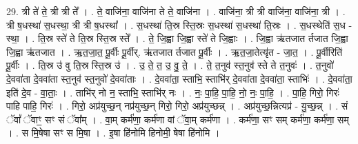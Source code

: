 \documentclass[17pt]{extarticle}
\begin{document}
29. त्री ते॑ ते॒ त्री त्री ते᳚ । . ते॒ वाजि॑ना॒ वाजि॑ना ते ते॒ वाजि॑ना । . वाजि॑ना॒ त्री त्री वाजि॑ना॒ वाजि॑ना॒ त्री । . त्री ष॒धस्था॑ स॒धस्था॒ त्री त्री ष॒धस्था᳚ । . स॒धस्था॑ ति॒स्र स्ति॒स्रः स॒धस्था॑ स॒धस्था॑ ति॒स्रः । . स॒धस्थेति॑ स॒ध - स्था॒ । . ति॒स्र स्ते॑ ते ति॒स्र स्ति॒स्र स्ते᳚ । . ते॒ जि॒ह्वा जि॒ह्वा स्ते॑ ते जि॒ह्वाः । . जि॒ह्वा ऋ॑तजात र्तजात जि॒ह्वा जि॒ह्वा ऋ॑तजात । . ऋ॒त॒जा॒त॒ पू॒र्वीः पू॒र्वीर्. ऋ॑तजात र्तजात पू॒र्वीः । . ऋ॒त॒जा॒तेत्यृ॑त - जा॒त॒ । . पू॒र्वीरिति॑ पू॒र्वीः । . ति॒स्र उ॑ वु ति॒स्र स्ति॒स्र उ॑ । . उ॒ ते॒ त॒ उ॒ वु॒ ते॒ । . ते॒ त॒नुव॑ स्त॒नुव॑ स्ते ते त॒नुवः॑ । . त॒नुवो॑ दे॒ववा॑ता दे॒ववा॑ता स्त॒नुव॑ स्त॒नुवो॑ दे॒ववा॑ताः । . दे॒ववा॑ता॒ स्ताभि॒ स्ताभि॑र् दे॒ववा॑ता दे॒ववा॑ता॒ स्ताभिः॑ । . दे॒ववा॑ता॒ इति॑ दे॒व - वा॒ताः॒ । . ताभि॑र् नो न॒ स्ताभि॒ स्ताभि॑र् नः । . नः॒ पा॒हि॒ पा॒हि॒ नो॒ नः॒ पा॒हि॒ । . पा॒हि॒ गिरो॒ गिरः॑ पाहि पाहि॒ गिरः॑ । . गिरो॒ अप्र॑युच्छ॒न् नप्र॑युच्छ॒न् गिरो॒ गिरो॒ अप्र॑युच्छन्न् । . अप्र॑युच्छ॒न्नित्यप्र॑ - यु॒च्छ॒न्न् । . सं ॅवां᳚ ॅवाꣳ॒॒ सꣳ सं ॅवा᳚म् । . वा॒म् कर्म॑णा॒ कर्म॑णा वां ॅवा॒म् कर्म॑णा । . कर्म॑णा॒ सꣳ सम् कर्म॑णा॒ कर्म॑णा॒ सम् । . स मि॒षेषा सꣳ स मि॒षा । . इ॒षा हि॑नोमि हिनोमी॒ षेषा हि॑नोमि । \newline
\end{document}
